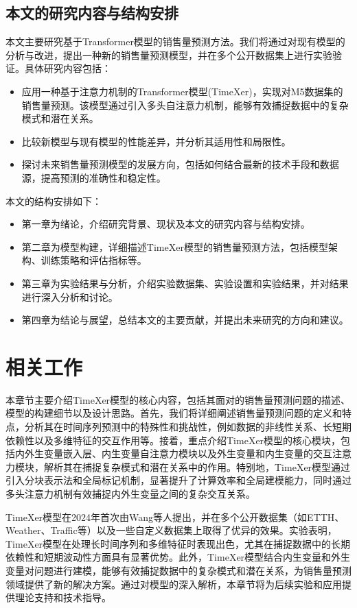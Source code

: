 \documentclass[12pt]{article}
\begin{document}
\subsection{本文的研究内容与结构安排}
本文主要研究基于Transformer模型的销售量预测方法。我们将通过对现有模型的分析与改进，提出一种新的销售量预测模型，并在多个公开数据集上进行实验验证。具体研究内容包括：
\begin{itemize}
    \item 应用一种基于注意力机制的Transformer模型(TimeXer\cite{TimeXer})，实现对M5数据集的销售量预测。该模型通过引入多头自注意力机制，能够有效捕捉数据中的复杂模式和潜在关系。
    \item 比较新模型与现有模型的性能差异，并分析其适用性和局限性。
    \item 探讨未来销售量预测模型的发展方向，包括如何结合最新的技术手段和数据源，提高预测的准确性和稳定性。
\end{itemize}
本文的结构安排如下：
\begin{itemize}
    \item 第一章为绪论，介绍研究背景、现状及本文的研究内容与结构安排。
    \item 第二章为模型构建，详细描述TimeXer模型的销售量预测方法，包括模型架构、训练策略和评估指标等。
    \item 第三章为实验结果与分析，介绍实验数据集、实验设置和实验结果，并对结果进行深入分析和讨论。
    \item 第四章为结论与展望，总结本文的主要贡献，并提出未来研究的方向和建议。
\end{itemize}


\newpage

\section{相关工作}
本章节主要介绍TimeXer模型的核心内容，包括其面对的销售量预测问题的描述、模型的构建细节以及设计思路。首先，我们将详细阐述销售量预测问题的定义和特点，分析其在时间序列预测中的特殊性和挑战性，例如数据的非线性关系、长短期依赖性以及多维特征的交互作用等。接着，重点介绍TimeXer模型的核心模块，包括内外生变量嵌入层、内生变量自注意力模块以及外生变量和内生变量的交互注意力模块，解析其在捕捉复杂模式和潜在关系中的作用。特别地，TimeXer模型通过引入分块表示法和全局标记机制，显著提升了计算效率和全局建模能力，同时通过多头注意力机制有效捕捉内外生变量之间的复杂交互关系。

TimeXer模型在2024年首次由Wang等人提出\cite{TimeXer}，并在多个公开数据集（如ETTH、Weather、Traffic等）以及一些自定义数据集上取得了优异的效果。实验表明，TimeXer模型在处理长时间序列和多维特征时表现出色，尤其在捕捉数据中的长期依赖性和短期波动性方面具有显著优势。此外，TimeXer模型结合内生变量和外生变量对问题进行建模，能够有效捕捉数据中的复杂模式和潜在关系，为销售量预测领域提供了新的解决方案。通过对模型的深入解析，本章节将为后续实验和应用提供理论支持和技术指导。
\end{document}
